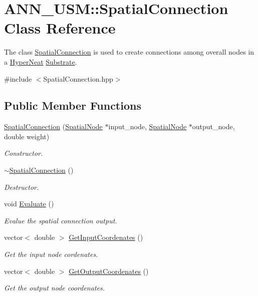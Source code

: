 \hypertarget{class_a_n_n___u_s_m_1_1_spatial_connection}{\section{A\-N\-N\-\_\-\-U\-S\-M\-:\-:Spatial\-Connection Class Reference}
\label{class_a_n_n___u_s_m_1_1_spatial_connection}
}


The class \hyperlink{class_a_n_n___u_s_m_1_1_spatial_connection}{Spatial\-Connection} is used to create connections among overall nodes in a \hyperlink{class_a_n_n___u_s_m_1_1_hyper_neat}{Hyper\-Neat} \hyperlink{class_a_n_n___u_s_m_1_1_substrate}{Substrate}.  




{\ttfamily \#include $<$Spatial\-Connection.\-hpp$>$}

\subsection*{Public Member Functions}
\begin{DoxyCompactItemize}
\item 
\hyperlink{class_a_n_n___u_s_m_1_1_spatial_connection_a2043e25434c9f6de7d49f878499b40c9}{Spatial\-Connection} (\hyperlink{class_a_n_n___u_s_m_1_1_spatial_node}{Spatial\-Node} $\ast$input\-\_\-node, \hyperlink{class_a_n_n___u_s_m_1_1_spatial_node}{Spatial\-Node} $\ast$output\-\_\-node, double weight)
\begin{DoxyCompactList}\small\item\em Constructor. \end{DoxyCompactList}\item 
\hyperlink{class_a_n_n___u_s_m_1_1_spatial_connection_a9965054cf2e32331a537ed19f79f9c1b}{$\sim$\-Spatial\-Connection} ()
\begin{DoxyCompactList}\small\item\em Destructor. \end{DoxyCompactList}\item 
void \hyperlink{class_a_n_n___u_s_m_1_1_spatial_connection_a6966fadad1b8fc5c538756bd960f5330}{Evaluate} ()
\begin{DoxyCompactList}\small\item\em Evalue the spatial connection output. \end{DoxyCompactList}\item 
vector$<$ double $>$ \hyperlink{class_a_n_n___u_s_m_1_1_spatial_connection_a87292c3fa64b90b2e4ab8f5c76960002}{Get\-Input\-Coordenates} ()
\begin{DoxyCompactList}\small\item\em Get the input node cordenates. \end{DoxyCompactList}\item 
vector$<$ double $>$ \hyperlink{class_a_n_n___u_s_m_1_1_spatial_connection_ab8a8bbebac081e28ef8a2a537168cd7b}{Get\-Output\-Coordenates} ()
\begin{DoxyCompactList}\small\item\em Get the output node coordenates. \end{DoxyCompactList}\end{DoxyCompactItemize}


